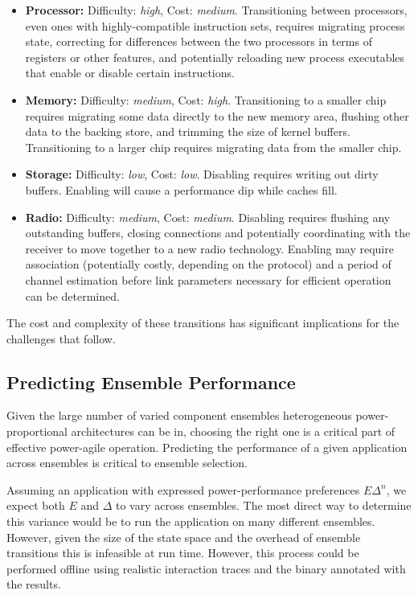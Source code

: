 \begin{itemize}

\item \textbf{Processor:} Difficulty: \textit{high}, Cost: \textit{medium}.
Transitioning between processors, even ones with highly-compatible
instruction sets, requires migrating process state, correcting for
differences between the two processors in terms of registers or other
features, and potentially reloading new process executables that enable or
disable certain instructions.

\item \textbf{Memory:} Difficulty: \textit{medium}, Cost: \textit{high}.
Transitioning to a smaller chip requires migrating some data directly to the
new memory area, flushing other data to the backing store, and trimming the
size of kernel buffers. Transitioning to a larger chip requires migrating
data from the smaller chip.

\item \textbf{Storage:} Difficulty: \textit{low}, Cost: \textit{low}.
Disabling requires writing out dirty buffers. Enabling will cause a
performance dip while caches fill.

\item \textbf{Radio:} Difficulty: \textit{medium}, Cost: \textit{medium}.
Disabling requires flushing any outstanding buffers, closing connections and
potentially coordinating with the receiver to move together to a new radio
technology. Enabling may require association (potentially costly, depending
on the protocol) and a period of channel estimation before link parameters
necessary for efficient operation can be determined.

\end{itemize}

The cost and complexity of these transitions has significant implications for
the challenges that follow.

\subsection{Predicting Ensemble Performance}

Given the large number of varied component ensembles heterogeneous
power-proportional architectures can be in, choosing the right one is a
critical part of effective power-agile operation. Predicting the performance
of a given application across ensembles is critical to ensemble selection.

Assuming an application with expressed power-performance preferences
$E\Delta^n$, we expect both $E$ and $\Delta$ to vary across ensembles. The
most direct way to determine this variance would be to run the application on
many different ensembles. However, given the size of the state space and the
overhead of ensemble transitions this is infeasible at run time. However,
this process could be performed offline using realistic interaction traces
and the binary annotated with the results.

